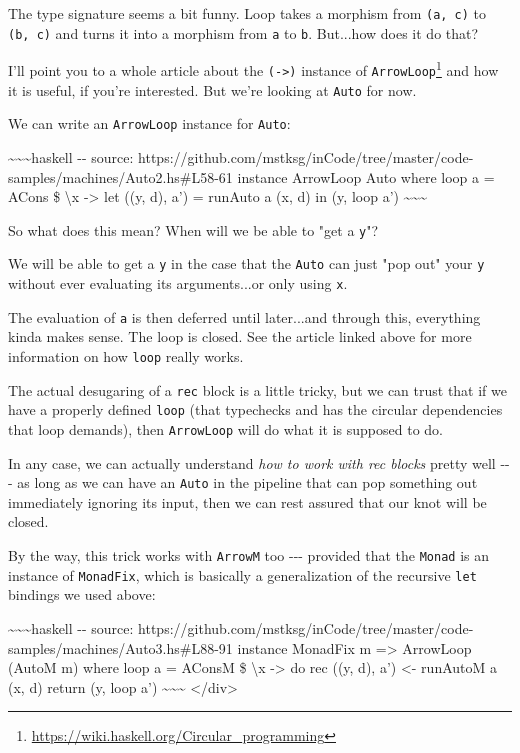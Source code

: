 \documentclass[]{article}
\renewcommand{\href}[2]{#2\footnote{\url{#1}}}
\begin{document}
The type signature seems a bit funny. Loop takes a morphism from
\texttt{(a,\ c)} to \texttt{(b,\ c)} and turns it into a morphism from
\texttt{a} to \texttt{b}. But...how does it do that?

I'll point you to \href{https://wiki.haskell.org/Circular_programming}{a whole
article about the \texttt{(-\textgreater{})} instance of \texttt{ArrowLoop}} and
how it is useful, if you're interested. But we're looking at \texttt{Auto} for
now.

We can write an \texttt{ArrowLoop} instance for \texttt{Auto}:

\textasciitilde{}\textasciitilde{}\textasciitilde{}haskell -\/- source:
https://github.com/mstksg/inCode/tree/master/code-samples/machines/Auto2.hs\#L58-61
instance ArrowLoop Auto where loop a = ACons \$ \textbackslash{}x
-\textgreater{} let ((y, d), a') = runAuto a (x, d) in (y, loop a')
\textasciitilde{}\textasciitilde{}\textasciitilde{}

So what does this mean? When will we be able to "get a \texttt{y}"?

We will be able to get a \texttt{y} in the case that the \texttt{Auto} can just
"pop out" your \texttt{y} without ever evaluating its arguments...or only using
\texttt{x}.

The evaluation of \texttt{a\textquotesingle{}} is then deferred until
later...and through this, everything kinda makes sense. The loop is closed. See
the article linked above for more information on how \texttt{loop} really works.

The actual desugaring of a \texttt{rec} block is a little tricky, but we can
trust that if we have a properly defined \texttt{loop} (that typechecks and has
the circular dependencies that loop demands), then \texttt{ArrowLoop} will do
what it is supposed to do.

In any case, we can actually understand \emph{how to work with rec blocks}
pretty well -\/-\/- as long as we can have an \texttt{Auto} in the pipeline that
can pop something out immediately ignoring its input, then we can rest assured
that our knot will be closed.

By the way, this trick works with \texttt{ArrowM} too -\/-\/- provided that the
\texttt{Monad} is an instance of \texttt{MonadFix}, which is basically a
generalization of the recursive \texttt{let} bindings we used above:

\textasciitilde{}\textasciitilde{}\textasciitilde{}haskell -\/- source:
https://github.com/mstksg/inCode/tree/master/code-samples/machines/Auto3.hs\#L88-91
instance MonadFix m =\textgreater{} ArrowLoop (AutoM m) where loop a = AConsM \$
\textbackslash{}x -\textgreater{} do rec ((y, d), a') \textless{}- runAutoM a
(x, d) return (y, loop a') \textasciitilde{}\textasciitilde{}\textasciitilde{}
\textless{}/div\textgreater{}
\end{document}
